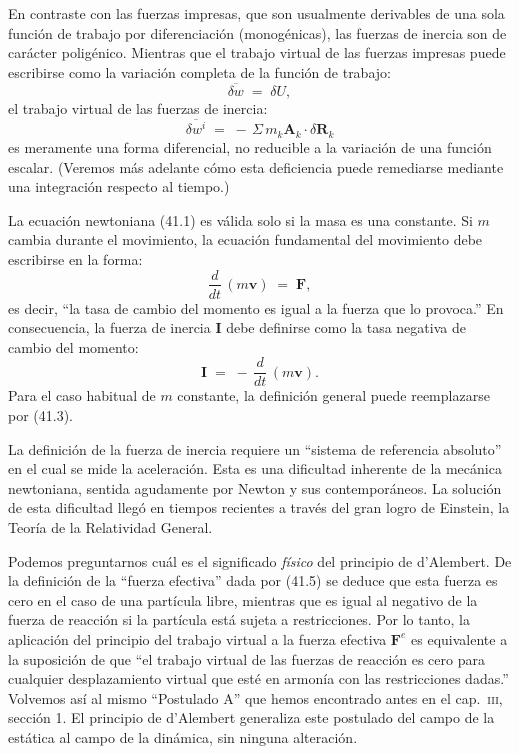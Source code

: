 \documentclass[12pt,a4paper]{book}
\begin{document}
En contraste con las fuerzas impresas, que son usualmente derivables de una sola función de trabajo por diferenciación (monogénicas), las fuerzas de inercia son de carácter poligénico. Mientras que el trabajo virtual de las fuerzas impresas puede escribirse como la variación completa de la función de trabajo:
\begin{equation}
\overline{\delta w} \;=\; \delta U, \tag{41.7}
\end{equation}
el trabajo virtual de las fuerzas de inercia:
\begin{equation}
\overline{\delta w^i} \;=\; -\,\Sigma\, m_k \mathbf{A}_k \cdot \delta\mathbf{R}_k \tag{41.8}
\end{equation}
es meramente una forma diferencial, no reducible a la variación de una función escalar. (Veremos más adelante cómo esta deficiencia puede remediarse mediante una integración respecto al tiempo.)

La ecuación newtoniana (41.1) es válida solo si la masa es una constante. Si $m$ cambia durante el movimiento, la ecuación fundamental del movimiento debe escribirse en la forma:
\begin{equation}
\frac{d}{dt}\,(m\mathbf{v}) \;=\; \mathbf{F}, \tag{41.9}
\end{equation}
es decir, ``la tasa de cambio del momento es igual a la fuerza que lo provoca.'' En consecuencia, la fuerza de inercia $\mathbf{I}$ debe definirse como la tasa negativa de cambio del momento:
\begin{equation}
\mathbf{I} \;=\; -\,\frac{d}{dt}\,(m\mathbf{v}). \tag{41.10}
\end{equation}
Para el caso habitual de $m$ constante, la definición general puede reemplazarse por (41.3).

La definición de la fuerza de inercia requiere un ``sistema de referencia absoluto'' en el cual se mide la aceleración. Esta es una dificultad inherente de la mecánica newtoniana, sentida agudamente por Newton y sus contemporáneos. La solución de esta dificultad llegó en tiempos recientes a través del gran logro de Einstein, la Teoría de la Relatividad General.

Podemos preguntarnos cuál es el significado \textit{físico} del principio de d'Alembert. De la definición de la ``fuerza efectiva'' dada por (41.5) se deduce que esta fuerza es cero en el caso de una partícula libre, mientras que es igual al negativo de la fuerza de reacción si la partícula está sujeta a restricciones. Por lo tanto, la aplicación del principio del trabajo virtual a la fuerza efectiva $\mathbf{F}^e$ es equivalente a la suposición de que ``el trabajo virtual de las fuerzas de reacción es cero para cualquier desplazamiento virtual que esté en armonía con las restricciones dadas.'' Volvemos así al mismo ``Postulado A'' que hemos encontrado antes en el cap.\ \textsc{iii}, sección 1. El principio de d'Alembert generaliza este postulado del campo de la estática al campo de la dinámica, sin ninguna alteración.
\end{document}
